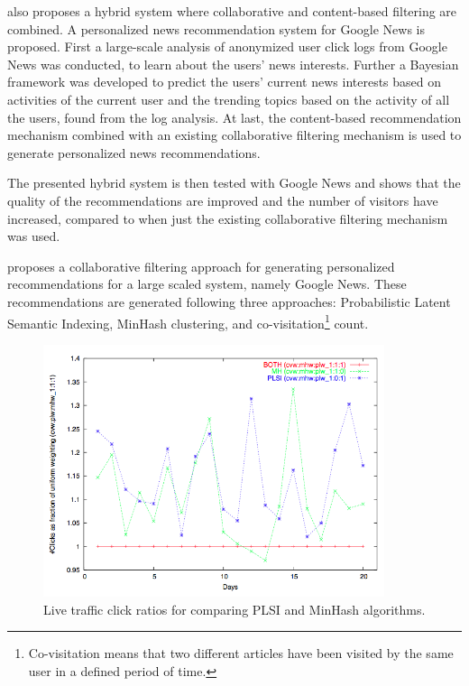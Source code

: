 \cite{liu2010personalized} also proposes a hybrid system where collaborative and content-based filtering are combined. A personalized news recommendation system for Google News is proposed. First a large-scale analysis of anonymized user click logs from Google News was conducted, to learn about the users' news interests. Further a Bayesian framework was developed to predict the users' current news interests based on activities of the current user and the trending topics based on the activity of all the users, found from the log analysis. At last, the content-based recommendation mechanism combined with an existing collaborative filtering mechanism is used to generate personalized news recommendations.

The presented hybrid system is then tested with Google News and shows that the quality of the recommendations are improved and the number of visitors have increased, compared to when just the existing collaborative filtering mechanism was used. 


\cite{das2007google} proposes a collaborative filtering approach for generating personalized recommendations for a large scaled system, namely Google News. These recommendations are generated following three approaches: Probabilistic Latent Semantic Indexing\cite{hofmann1999probabilistic}, MinHash\cite{broder1997resemblance} clustering, and co-visitation\footnote{Co-visitation means that two different articles have been visited by the same user in a defined period of time\cite{jannachrecommender}.} count.

\begin{figure}[!htbp]
\centering
\includegraphics[width=100mm]{GFX/tech/googleNewsPersonalizationMinHashPLSI.png}
\caption{Live traffic click ratios for comparing PLSI and MinHash algorithms.}
\label{google_news_personalization_minhash_plsi}
\end{figure}

